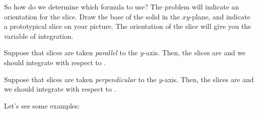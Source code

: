 \documentclass{ximera}
\begin{document}
So how do we determine which formula to use?  The problem will indicate an orientation for the slice. Draw the base of the solid in the $xy$-plane, and indicate a prototypical slice on your picture. The orientation of the slice will give you the variable of integration.

\begin{question}
Suppose that slices are taken \emph{parallel} to the $y$-axis.  Then, the slices are  and we should integrate with respect to .

Suppose that slices are taken \emph{perpendicular} to the $y$-axis.  Then, the slices are  and we should integrate with respect to .

\end{question}





Let's see some examples:
\end{document}
